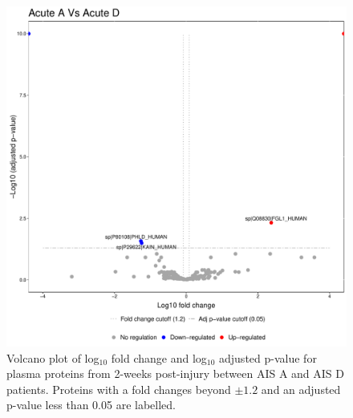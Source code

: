 \documentclass[9pt,lineno]{elife}
\begin{document}
\begin{landscape}
\begin{landscape}
\begin{landscape}
\begin{landscape}
\begin{figure}
\includegraphics[width=1\linewidth]{figures/openms_protein_quantification/label_free/volcano_plots/openms_volcano_plot_2021-08-10_0003} \caption{Volcano plot of log\(_10\) fold change and log\(_10\) adjusted p-value for plasma proteins from 2-weeks post-injury between AIS A and AIS D patients. Proteins with a fold changes beyond \(\pm 1.2\) and an adjusted p-value less than 0.05 are labelled.}\label{fig:volc-plot-acute-a-vs-acute-d}
\end{figure}




\end{landscape}
\end{landscape}
\end{landscape}
\end{landscape}
\end{document}
